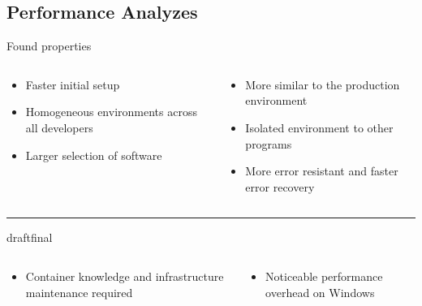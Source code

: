 \documentclass{beamer}
\def\final{final}
\def\status{draft}
\begin{document}
\subsection{Performance Analyzes}
\begin{frame}{}
  \vspace{-.5cm}
  \begin{center}
    \Large Found properties
  \end{center}
  \begin{columns}
    \begin{column}{0.5\textwidth}
      \begin{itemize}
        \setlength\itemsep{0.6em}
        \item Faster initial setup
        \item Homogeneous environments across all developers
        \item Larger selection of software
      \end{itemize}
    \end{column}
    \begin{column}{0.5\textwidth}
      \begin{itemize}
        \setlength\itemsep{0.6em}
        \item More similar to the production environment
        \item Isolated environment to other programs
        \item More error resistant and faster error recovery
      \end{itemize}
    \end{column}
  \end{columns}

  \vspace{.5cm}
  {\color{uos-red-full}\rule{\textwidth}{1.5pt}}

  \ifx\status\final{}
    \pause{}
  \fi


  \begin{columns}
    \begin{column}{0.5\textwidth}
      \begin{itemize}
        \setlength\itemsep{0.6em}
        \item Container knowledge and infrastructure maintenance required
      \end{itemize}
    \end{column}
    \begin{column}{0.5\textwidth}
      \begin{itemize}
        \setlength\itemsep{0.6em}
        \item Noticeable performance overhead on Windows
      \end{itemize}
    \end{column}
  \end{columns}
\end{frame}
\end{document}
